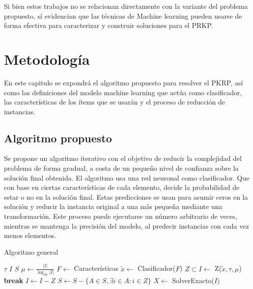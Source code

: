 \documentclass[spanish, a4paper, 12pt, openany,final]{book}
\begin{document}
Si bien estos trabajos no se relacionan directamente con la variante del problema propuesto, sí evidencian que las técnicas de Machine learning pueden usarse de forma efectiva para caracterizar y construir soluciones para el PRKP.
  



\chapter{Metodología}

En este capitulo se expondrá el algoritmo propuesto para resolver el PKRP, así como las definiciones del modelo machine learning que actúa como clasificador, las características de los ítems que se usarán y el proceso de reducción de instancias.

\section{Algoritmo propuesto}

Se propone un algoritmo iterativo con el objetivo de reducir la complejidad del problema de forma gradual, a costa de un pequeño nivel de confianza sobre la solución final obtenida. El algoritmo usa una red neuronal como clasificador. Que con base en ciertas características de cada elemento, decide la probabilidad de estar o no en la solución final. Estas predicciones se usan para asumir ceros en la solución y reducir la instancia original a una más pequeña mediante una transformación. Este proceso puede ejecutarse un número arbitrario de veces, mientras se mantenga la precisión del modelo, al predecir instancias con cada vez menos elementos.

\begin{algorithm}[H]
	\caption{Algoritmo general}\label{alg:general}
	\begin{algorithmic}[1]
		\State $\tau$ \label{alg1:def_tau} 
		\State $I$ \label{alg1:I} 
		\State $S$ \label{alg1:sinergias} 
		\Loop
		\State $\mu \gets \frac{|I|}{\log_{10}{|I|}}$ \label{alg1:def_mu} 
		\State $F \gets$ Características \label{alg1:full_features} 
		\State $\tilde{x} \gets$ Clasificador($F$) \label{alg1:get_pred} 
		\State $Z \subset I \gets$ Z($\tilde{x},\tau,\mu$) \label{alg1:get_Z} 
		 \label{alg1:break_condition}
		\State \textbf{break}
		\EndIf
		\State $I \gets I-Z$  \label{alg1:update_I}
		\State $S \gets S - \{A \in S, \exists i \in A: i \in Z\}$ \label{alg1:update_S}
		\EndLoop
		\State $X \gets$ SolverExacto($I$) \label{alg1:exact_solver} 
	\end{algorithmic}
\end{algorithm}
\end{document}
